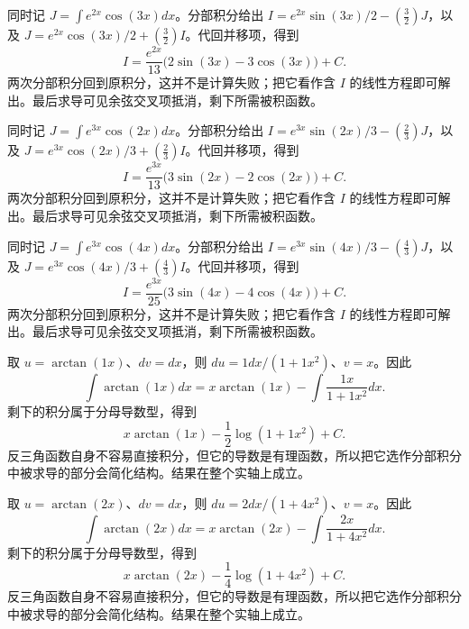 \documentclass[12pt,fontset=fandol]{ctexart}
\begin{document}
\begin{solve}\label{ans:c15q4}
同时记 $J=\int e^{2x}\cos(3x)dx$。分部积分给出 $I=e^{2x}\sin(3x)/2-(\frac{3}{2})J$，以及 $J=e^{2x}\cos(3x)/2+(\frac{3}{2})I$。代回并移项，得到
\[
I=\frac{e^{2x}}{13}\bigl(2\sin(3x)-3\cos(3x)\bigr)+C.
\]
两次分部积分回到原积分，这并不是计算失败；把它看作含 $I$ 的线性方程即可解出。最后求导可见余弦交叉项抵消，剩下所需被积函数。
\end{solve}

\begin{solve}\label{ans:c15q5}
同时记 $J=\int e^{3x}\cos(2x)dx$。分部积分给出 $I=e^{3x}\sin(2x)/3-(\frac{2}{3})J$，以及 $J=e^{3x}\cos(2x)/3+(\frac{2}{3})I$。代回并移项，得到
\[
I=\frac{e^{3x}}{13}\bigl(3\sin(2x)-2\cos(2x)\bigr)+C.
\]
两次分部积分回到原积分，这并不是计算失败；把它看作含 $I$ 的线性方程即可解出。最后求导可见余弦交叉项抵消，剩下所需被积函数。
\end{solve}

\begin{solve}\label{ans:c15q6}
同时记 $J=\int e^{3x}\cos(4x)dx$。分部积分给出 $I=e^{3x}\sin(4x)/3-(\frac{4}{3})J$，以及 $J=e^{3x}\cos(4x)/3+(\frac{4}{3})I$。代回并移项，得到
\[
I=\frac{e^{3x}}{25}\bigl(3\sin(4x)-4\cos(4x)\bigr)+C.
\]
两次分部积分回到原积分，这并不是计算失败；把它看作含 $I$ 的线性方程即可解出。最后求导可见余弦交叉项抵消，剩下所需被积函数。
\end{solve}

\begin{solve}\label{ans:c15q7}
取 $u=\arctan(1x)$、$dv=dx$，则 $du=1dx/(1+1x^2)$、$v=x$。因此
\[
\int\arctan(1x)dx=x\arctan(1x)-\int\frac{1x}{1+1x^2}dx.
\]
剩下的积分属于分母导数型，得到
\[
x\arctan(1x)-\frac{1}{2}\log(1+1x^2)+C.
\]
反三角函数自身不容易直接积分，但它的导数是有理函数，所以把它选作分部积分中被求导的部分会简化结构。结果在整个实轴上成立。
\end{solve}

\begin{solve}\label{ans:c15q8}
取 $u=\arctan(2x)$、$dv=dx$，则 $du=2dx/(1+4x^2)$、$v=x$。因此
\[
\int\arctan(2x)dx=x\arctan(2x)-\int\frac{2x}{1+4x^2}dx.
\]
剩下的积分属于分母导数型，得到
\[
x\arctan(2x)-\frac{1}{4}\log(1+4x^2)+C.
\]
反三角函数自身不容易直接积分，但它的导数是有理函数，所以把它选作分部积分中被求导的部分会简化结构。结果在整个实轴上成立。
\end{solve}
\end{document}
